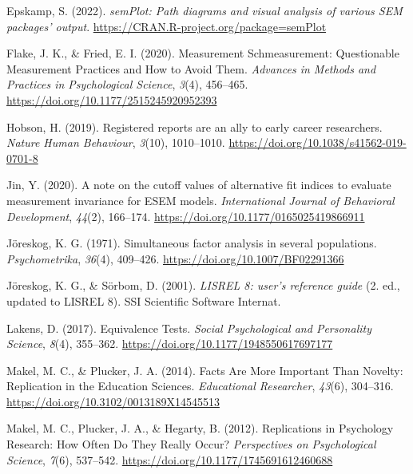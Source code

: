 \documentclass[
  man]{apa7}
\newlength{\cslhangindent}
\newlength{\cslentryspacingunit} %
\newenvironment{CSLReferences}[2] %
 {%
  \setlength{\parindent}{0pt}
  \ifodd #1
  \let\oldpar\par
  \def\par{\hangindent=\cslhangindent\oldpar}
  \fi
  \setlength{\parskip}{#2\cslentryspacingunit}
 }%
 {}
\begin{document}
\begin{CSLReferences}{1}{0}
\leavevmode{}%
Epskamp, S. (2022). \emph{semPlot: Path diagrams and visual analysis of various SEM packages' output}. \url{https://CRAN.R-project.org/package=semPlot}

\leavevmode{}%
Flake, J. K., \& Fried, E. I. (2020). Measurement Schmeasurement: Questionable Measurement Practices and How to Avoid Them. \emph{Advances in Methods and Practices in Psychological Science}, \emph{3}(4), 456--465. \url{https://doi.org/10.1177/2515245920952393}

\leavevmode{}%
Hobson, H. (2019). Registered reports are an ally to early career researchers. \emph{Nature Human Behaviour}, \emph{3}(10), 1010--1010. \url{https://doi.org/10.1038/s41562-019-0701-8}

\leavevmode{}%
Jin, Y. (2020). A note on the cutoff values of alternative fit indices to evaluate measurement invariance for ESEM models. \emph{International Journal of Behavioral Development}, \emph{44}(2), 166--174. \url{https://doi.org/10.1177/0165025419866911}

\leavevmode{}%
Jöreskog, K. G. (1971). Simultaneous factor analysis in several populations. \emph{Psychometrika}, \emph{36}(4), 409--426. \url{https://doi.org/10.1007/BF02291366}

\leavevmode{}%
Jöreskog, K. G., \& Sörbom, D. (2001). \emph{LISREL 8: user's reference guide} (2. ed., updated to LISREL 8). SSI Scientific Software Internat.

\leavevmode{}%
Lakens, D. (2017). Equivalence Tests. \emph{Social Psychological and Personality Science}, \emph{8}(4), 355--362. \url{https://doi.org/10.1177/1948550617697177}

\leavevmode{}%
Makel, M. C., \& Plucker, J. A. (2014). Facts Are More Important Than Novelty: Replication in the Education Sciences. \emph{Educational Researcher}, \emph{43}(6), 304--316. \url{https://doi.org/10.3102/0013189X14545513}

\leavevmode{}%
Makel, M. C., Plucker, J. A., \& Hegarty, B. (2012). Replications in Psychology Research: How Often Do They Really Occur? \emph{Perspectives on Psychological Science}, \emph{7}(6), 537--542. \url{https://doi.org/10.1177/1745691612460688}


\end{CSLReferences}
\end{document}
